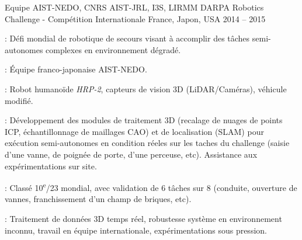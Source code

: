 \begin{cventries}
  \cventry
    {Equipe AIST-NEDO, CNRS AIST-JRL, I3S, LIRMM} %
    {DARPA Robotics Challenge - Compétition Internationale} %
    {France, Japon, USA} %
    {2014 -- 2015} %
    {
      \begin{cvitems} 
        \item {} : Défi mondial de robotique de secours visant à accomplir des tâches semi-autonomes complexes en environnement dégradé.
        \item {} : Équipe franco-japonaise AIST-NEDO.
        \item {} : Robot humanoïde \emph{HRP-2}, capteurs de vision 3D (LiDAR/Caméras), véhicule modifié.
        \item {} : Développement des modules de traitement 3D (recalage de nuages de points ICP, échantillonnage de maillages CAO) et de localisation (SLAM) pour exécution semi-autonomes en condition réeles sur les taches du challenge (saisie d'une vanne, de poignée de porte, d'une perceuse, etc). Assistance aux expérimentations sur site.
        \item {} : Classé 10\textsuperscript{e}/23 mondial, avec validation de 6 tâches sur 8 (conduite, ouverture de vannes, franchissement d'un champ de briques, etc).
        \item {} : Traitement de données 3D temps réel, robustesse système en environnement inconnu, travail en équipe internationale, expérimentations sous pression.
      \end{cvitems}
    }
    
\end{cventries}
